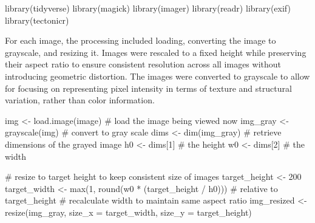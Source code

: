 \documentclass[
]{article}
\newenvironment{Shaded}{\begin{snugshade}}{\end{snugshade}}
\newcommand{\AttributeTok}[1]{\textcolor[rgb]{0.40,0.45,0.13}{#1}}
\newcommand{\CommentTok}[1]{\textcolor[rgb]{0.37,0.37,0.37}{#1}}
\newcommand{\DecValTok}[1]{\textcolor[rgb]{0.68,0.00,0.00}{#1}}
\newcommand{\FunctionTok}[1]{\textcolor[rgb]{0.28,0.35,0.67}{#1}}
\newcommand{\NormalTok}[1]{\textcolor[rgb]{0.00,0.23,0.31}{#1}}
\newcommand{\OtherTok}[1]{\textcolor[rgb]{0.00,0.23,0.31}{#1}}
\newcommand{\SpecialCharTok}[1]{\textcolor[rgb]{0.37,0.37,0.37}{#1}}
\begin{document}
\clearpage

\begin{Shaded}
\begin{Highlighting}[]
\FunctionTok{library}\NormalTok{(tidyverse)}
\FunctionTok{library}\NormalTok{(magick)}
\FunctionTok{library}\NormalTok{(imager)}
\FunctionTok{library}\NormalTok{(readr)}
\FunctionTok{library}\NormalTok{(exif)}
\FunctionTok{library}\NormalTok{(tectonicr)}
\end{Highlighting}
\end{Shaded}

For each image, the processing included loading, converting the image to
grayscale, and resizing it. Images were rescaled to a fixed height while
preserving their aspect ratio to ensure consistent resolution across all
images without introducing geometric distortion. The images were
converted to grayscale to allow for focusing on representing pixel
intensity in terms of texture and structural variation, rather than
color information.

\begin{Shaded}
\begin{Highlighting}[]
\NormalTok{  img }\OtherTok{\textless{}{-}} \FunctionTok{load.image}\NormalTok{(image) }\CommentTok{\# load the image being viewed now}
\NormalTok{  img\_gray }\OtherTok{\textless{}{-}} \FunctionTok{grayscale}\NormalTok{(img) }\CommentTok{\# convert to gray scale}
\NormalTok{  dims }\OtherTok{\textless{}{-}} \FunctionTok{dim}\NormalTok{(img\_gray) }\CommentTok{\# retrieve dimensions of the grayed image}
\NormalTok{  h0 }\OtherTok{\textless{}{-}}\NormalTok{ dims[}\DecValTok{1}\NormalTok{] }\CommentTok{\# the height}
\NormalTok{  w0 }\OtherTok{\textless{}{-}}\NormalTok{ dims[}\DecValTok{2}\NormalTok{] }\CommentTok{\# the width}
  
  \CommentTok{\# resize to target height to keep consistent size of images}
\NormalTok{  target\_height }\OtherTok{\textless{}{-}} \DecValTok{200} 
\NormalTok{  target\_width }\OtherTok{\textless{}{-}} \FunctionTok{max}\NormalTok{(}\DecValTok{1}\NormalTok{, }\FunctionTok{round}\NormalTok{(w0 }\SpecialCharTok{*}\NormalTok{ (target\_height }\SpecialCharTok{/}\NormalTok{ h0))) }
  \CommentTok{\# relative to target\_height}
  \CommentTok{\# recalculate width to maintain same aspect ratio}
\NormalTok{  img\_resized }\OtherTok{\textless{}{-}} \FunctionTok{resize}\NormalTok{(img\_gray, }\AttributeTok{size\_x =}\NormalTok{ target\_width, }
  \AttributeTok{size\_y =}\NormalTok{ target\_height)}
\end{Highlighting}
\end{Shaded}
\end{document}
